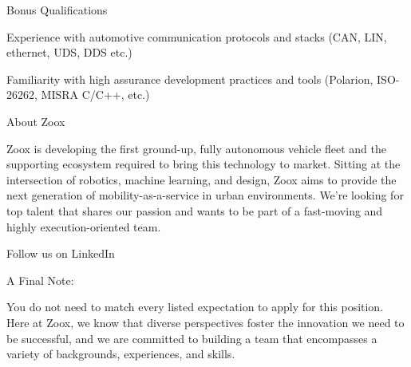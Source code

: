 \par Bonus Qualifications
\par Experience with automotive communication protocols and stacks (CAN, LIN, ethernet, UDS, DDS etc.)
\par Familiarity with high assurance development practices and tools (Polarion, ISO-26262, MISRA C/C++, etc.)
\par About Zoox
\par Zoox is developing the first ground-up, fully autonomous vehicle fleet and the supporting ecosystem required to bring this technology to market. Sitting at the intersection of robotics, machine learning, and design, Zoox aims to provide the next generation of mobility-as-a-service in urban environments. We’re looking for top talent that shares our passion and wants to be part of a fast-moving and highly execution-oriented team.
\par Follow us on LinkedIn
\par A Final Note:
\par You do not need to match every listed expectation to apply for this position. Here at Zoox, we know that diverse perspectives foster the innovation we need to be successful, and we are committed to building a team that encompasses a variety of backgrounds, experiences, and skills.

\bye
